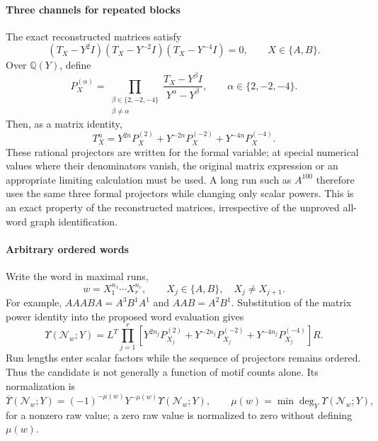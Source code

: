 \documentclass[10pt,twocolumn]{article}
\begin{document}
\paragraph{Three channels for repeated blocks}
\label{supp:transfer_cubic}
The exact reconstructed matrices satisfy
\begin{equation}
\boxed{(T_X-Y^2I)(T_X-Y^{-2}I)(T_X-Y^{-4}I)=0,\qquad X\in\{A,B\}.}
\label{supp:deriv:eq:cubic}
\end{equation}
Over $\mathbb Q(Y)$, define
\begin{equation}
P_X^{(\alpha)}=\prod_{\substack{\beta\in\{2,-2,-4\}\\\beta\neq\alpha}}\frac{T_X-Y^\beta I}{Y^\alpha-Y^\beta},\qquad\alpha\in\{2,-2,-4\}.
\label{supp:deriv:eq:projector_general}
\end{equation}
Then, as a matrix identity,
\begin{equation}
T_X^n=Y^{2n}P_X^{(2)}+Y^{-2n}P_X^{(-2)}+Y^{-4n}P_X^{(-4)}.
\label{supp:deriv:eq:run_power}
\end{equation}
These rational projectors are written for the formal variable; at special numerical values where their denominators vanish, the original matrix expression or an appropriate limiting calculation must be used. A long run such as $A^{100}$ therefore uses the same three formal projectors while changing only scalar powers. This is an exact property of the reconstructed matrices, irrespective of the unproved all-word graph identification.

\paragraph{Arbitrary ordered words}
\label{supp:transfer_ordered_words}
Write the word in maximal runs,
\begin{equation}
w=X_1^{n_1}\cdots X_r^{n_r},\qquad X_j\in\{A,B\},\quad X_j\neq X_{j+1}.
\label{supp:deriv:eq:run_decomp}
\end{equation}
For example, $AAABA=A^3B^1A^1$ and $AAB=A^2B^1$. Substitution of the matrix power identity into the proposed word evaluation gives
\begin{equation}
\boxed{\Upsilon(\mathcal N_w;Y)=L^T\prod_{j=1}^r\left[Y^{2n_j}P_{X_j}^{(2)}+Y^{-2n_j}P_{X_j}^{(-2)}+Y^{-4n_j}P_{X_j}^{(-4)}\right]R.}
\label{supp:deriv:eq:raw_nonabelian_final}
\end{equation}
Run lengths enter scalar factors while the sequence of projectors remains ordered. Thus the candidate is not generally a function of motif counts alone. Its normalization is
\begin{equation}
\overline{\Upsilon}(\mathcal N_w;Y)=(-1)^{-\mu(w)}Y^{-\mu(w)}\Upsilon(\mathcal N_w;Y),\qquad
\mu(w)=\min\deg_Y\Upsilon(\mathcal N_w;Y),
\label{supp:deriv:eq:normalization}
\end{equation}
for a nonzero raw value; a zero raw value is normalized to zero without defining $\mu(w)$.
\end{document}
